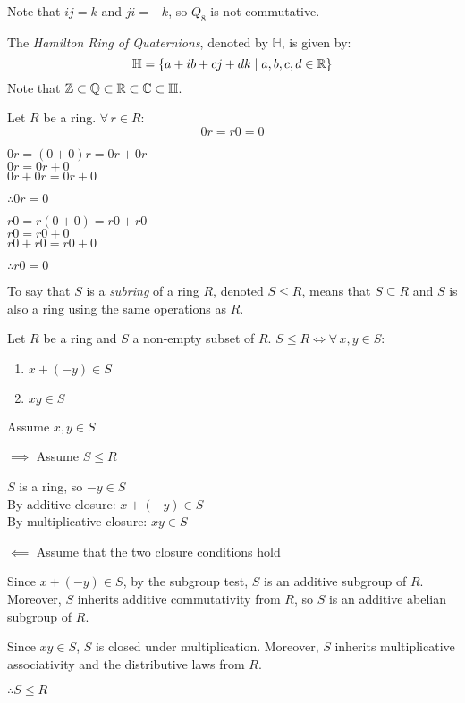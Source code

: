 \documentclass[letterpaper,12pt,fleqn]{article}
\renewcommand{\H}{\mathbb{H}}
\begin{document}
Note that $ij=k$ and $ji=-k$, so $Q_8$ is not commutative.

\begin{definition}
  The \emph{Hamilton Ring of Quaternions}, denoted by $\H$, is given by:
  \[\H=\{a+ib+cj+dk\mid a,b,c,d\in\R\}\]
  Note that $\Z\subset\Q\subset\R\subset\C\subset\H$.
\end{definition}

\begin{theorem}
  Let $R$ be a ring. $\forall\,r\in R$:
  \[0r=r0=0\]
\end{theorem}

\begin{theproof}
  $0r=(0+0)r=0r+0r$ \\
  $0r=0r+0$ \\
  $0r+0r=0r+0$

  $\therefore 0r=0$

  $r0=r(0+0)=r0+r0$ \\
  $r0=r0+0$ \\
  $r0+r0=r0+0$

  $\therefore r0=0$
\end{theproof}

\begin{definition}[Subring]
  To say that $S$ is a \emph{subring} of a ring $R$, denoted $S\le R$, means
  that $S\subseteq R$ and $S$ is also a ring using the same operations as $R$.
\end{definition}

\begin{theorem}
  Let $R$ be a ring and $S$ a non-empty subset of $R$.
  $S\le R\iff\forall\,x,y\in S$:
  \begin{enumerate}
  \item $x+(-y)\in S$
  \item $xy\in S$
  \end{enumerate}
\end{theorem}

\begin{theproof}
  Assume $x,y\in S$
  \begin{description}
  \item $\implies$ Assume $S\le R$

    $S$ is a ring, so $-y\in S$ \\
    By additive closure: $x+(-y)\in S$ \\
    By multiplicative closure: $xy\in S$
\newpage
  \item $\impliedby$ Assume that the two closure conditions hold

    Since $x+(-y)\in S$, by the subgroup test, $S$ is an additive subgroup of
    $R$. Moreover, $S$ inherits additive commutativity from $R$, so $S$ is an
    additive abelian subgroup of $R$.

    Since $xy\in S$, $S$ is closed under multiplication. Moreover, $S$ inherits
    multiplicative associativity and the distributive laws from $R$.

    $\therefore S\le R$
  \end{description}
\end{theproof}
\end{document}
